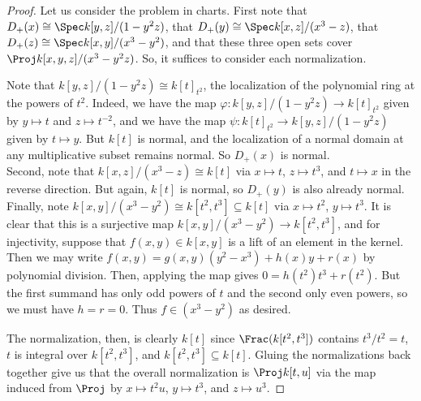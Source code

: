 \begin{proof}
	Let us consider the problem in charts. First note that $D_{+}(x) \cong \Spec k[y,z]/(1-y^2z)$, that $D_{+}(y) \cong \Spec k[x,z]/(x^3-z)$, that $D_{+}(z) \cong \Spec k[x,y]/(x^3-y^2)$, and that these three open sets cover $\Proj k[x,y,z]/(x^3-y^2z)$. So, it suffices to consider each normalization.
	
	Note that $k[y,z]/(1-y^2z) \cong k[t]_{t^2}$, the localization of the polynomial ring at the powers of $t^2$. Indeed, we have the map $\varphi : k[y,z]/(1-y^2z) \to k[t]_{t^2}$ given by $y \mapsto t$ and $z \mapsto t^{-2}$, and we have the map $\psi : k[t]_{t^2} \to k[y,z]/(1-y^2z)$ given by $t \mapsto y$. But $k[t]$ is normal, and the localization of a normal domain at any multiplicative subset remains normal. So $D_{+}(x)$ is normal. \\
	
	Second, note that $k[x,z]/(x^3-z) \cong k[t]$ via $x \mapsto t$, $z \mapsto t^3$, and $t \mapsto x$ in the reverse direction. But again, $k[t]$ is normal, so $D_{+}(y)$ is also already normal. \\
	
	Finally, note $k[x,y]/(x^3-y^2) \cong k[t^2,t^3] \subseteq k[t]$ via $x \mapsto t^2$, $y \mapsto t^3$. It is clear that this is a surjective map $k[x,y]/(x^3-y^2) \to k[t^2,t^3]$, and for injectivity, suppose that $f(x,y) \in k[x,y]$ is a lift of an element in the kernel. Then we may write $f(x,y) = g(x,y)(y^2-x^3) + h(x)y + r(x)$ by polynomial division. Then, applying the map gives $0 = h(t^2)t^3 + r(t^2)$. But the first summand has only odd powers of $t$ and the second only even powers, so we must have $h = r = 0$. Thus $f \in (x^3-y^2)$ as desired.
	
	The normalization, then, is clearly $k[t]$ since $\Frac(k[t^2,t^3])$ contains $t^3/t^2 = t$, $t$ is integral over $k[t^2,t^3]$, and $k[t^2,t^3] \subseteq k[t]$. Gluing the normalizations back together give us that the overall normalization is $\Proj k[t,u]$ via the map induced from $\Proj$ by $x \mapsto t^2u$, $y \mapsto t^3$, and $z \mapsto u^3$.
\end{proof}
